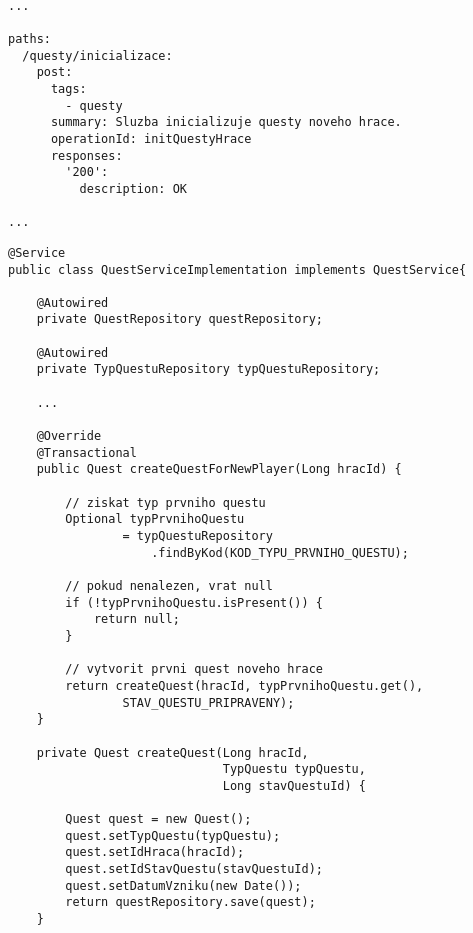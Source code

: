 \documentclass[twoside, 12pt]{article}
\begin{document}
{{

\vspace{10}




\begin{lstlisting}

...

paths:
  /questy/inicializace:
    post:
      tags:
        - questy
      summary: Sluzba inicializuje questy noveho hrace.
      operationId: initQuestyHrace
      responses:
        '200':
          description: OK

...

\end{lstlisting}

\vspace{50}


\begin{lstlisting}
@Service
public class QuestServiceImplementation implements QuestService{

    @Autowired
    private QuestRepository questRepository;

    @Autowired
    private TypQuestuRepository typQuestuRepository;

    ...

    @Override
    @Transactional
    public Quest createQuestForNewPlayer(Long hracId) {

        // ziskat typ prvniho questu
        Optional typPrvnihoQuestu
                = typQuestuRepository
                    .findByKod(KOD_TYPU_PRVNIHO_QUESTU);

        // pokud nenalezen, vrat null
        if (!typPrvnihoQuestu.isPresent()) {
            return null;
        }

        // vytvorit prvni quest noveho hrace
        return createQuest(hracId, typPrvnihoQuestu.get(),
                STAV_QUESTU_PRIPRAVENY);
    }

    private Quest createQuest(Long hracId,
                              TypQuestu typQuestu,
                              Long stavQuestuId) {

        Quest quest = new Quest();
        quest.setTypQuestu(typQuestu);
        quest.setIdHraca(hracId);
        quest.setIdStavQuestu(stavQuestuId);
        quest.setDatumVzniku(new Date());
        return questRepository.save(quest);
    }


\end{lstlisting}}}
\end{document}
